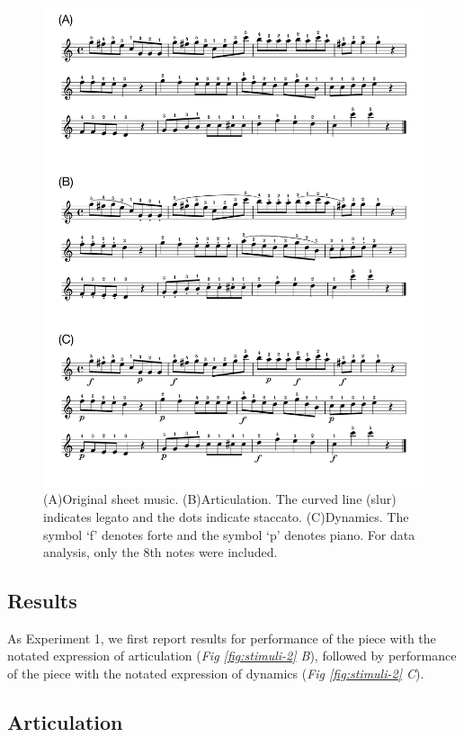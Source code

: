 \documentclass[
  man,floatsintext]{apa6}
\begin{document}
\begin{figure}
\includegraphics[width=1\linewidth]{manuscript_files/figure-latex/stim-2-1} \caption{\label{fig:stimuli-2}(A)Original sheet music. (B)Articulation. The curved line (slur) indicates legato and the dots indicate staccato. (C)Dynamics. The symbol `f' denotes forte and the symbol `p' denotes piano. For data analysis, only the 8th notes were included.}\label{fig:stim-2}
\end{figure}

\hypertarget{results-1}{%
\subsection{Results}\label{results-1}}

As Experiment 1, we first report results for performance of the piece with the notated expression of articulation (\emph{Fig \ref{fig:stimuli-2} B}), followed by performance of the piece with the notated expression of dynamics (\emph{Fig \ref{fig:stimuli-2} C}).

\hypertarget{articulation-1}{%
\subsection{Articulation}\label{articulation-1}}
\end{document}
